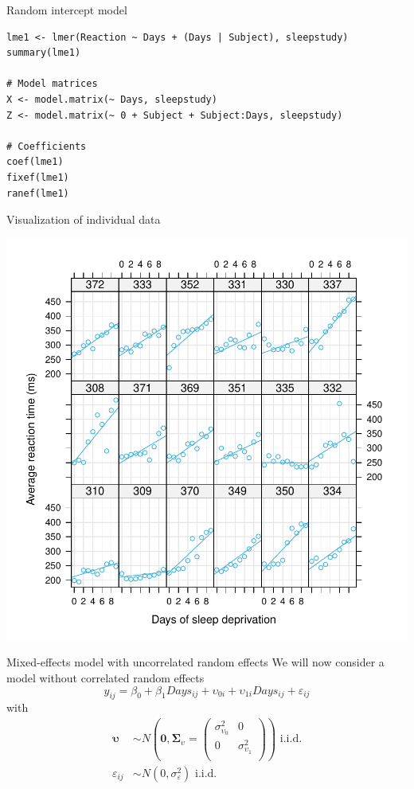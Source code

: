 \documentclass[aspectratio=169]{beamer}
\newcommand{\gvect}[1]{\boldsymbol{#1}}
\newcommand{\gmat}[1]{\boldsymbol{#1}}
\begin{document}
{

\begin{frame}[fragile]{Random intercept model}
\begin{lstlisting}
lme1 <- lmer(Reaction ~ Days + (Days | Subject), sleepstudy)
summary(lme1)

# Model matrices
X <- model.matrix(~ Days, sleepstudy)
Z <- model.matrix(~ 0 + Subject + Subject:Days, sleepstudy)

# Coefficients
coef(lme1)
fixef(lme1)
ranef(lme1)
\end{lstlisting}
\end{frame}

}


\begin{frame}{Visualization of individual data}
  \begin{center}
      \includegraphics[scale=.37]{../figures/sleep_random_slope}
  \end{center}
\end{frame}


\begin{frame}[fragile]{Mixed-effects model with uncorrelated random effects}
  We will now consider a model without correlated random effects
  \[
    y_{ij} = \beta_0 + \beta_1 Days_{ij} + \upsilon_{0i} + \upsilon_{1i} Days_{ij} +
    \varepsilon_{ij}
  \]
with
\begin{align*}
  \gvect{\upsilon} & \sim N\left(\gvect{0}, \gmat{\Sigma}_{\upsilon} = 
    \begin{pmatrix}
      \sigma^2_{\upsilon_0} & 0 \\
      0 & \sigma^2_{\upsilon_1} \\
    \end{pmatrix}\right) 
    \text{ i.i.d.} \\
  \varepsilon_{ij} & \sim N(0, \sigma_{\varepsilon}^2)
    \text{ i.i.d.}
\end{align*}
\end{frame}
\end{document}

